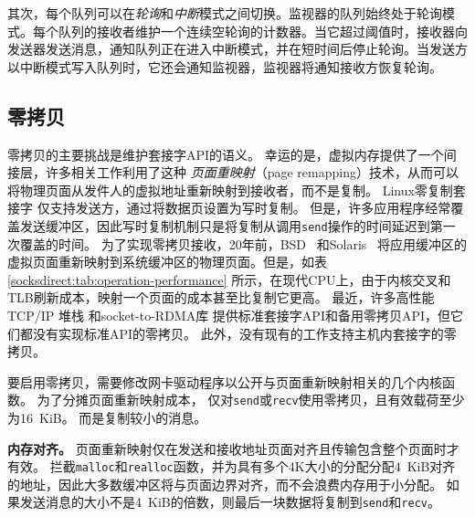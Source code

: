 其次，每个队列可以在\textit {轮询}和\textit {中断}模式之间切换。监视器的队列始终处于轮询模式。每个队列的接收者维护一个连续空轮询的计数器。当它超过阈值时，接收器向发送器发送消息，通知队列正在进入中断模式，并在短时间后停止轮询。当发送方以中断模式写入队列时，它还会通知监视器，监视器将通知接收方恢复轮询。




\subsection{零拷贝}
\label{socksdirect:subsec:zerocopy}


零拷贝的主要挑战是维护套接字API的语义。
幸运的是，虚拟内存提供了一个间接层，许多相关工作利用了这种 \emph {页面重映射}（page remapping）技术，从而可以将物理页面从发件人的虚拟地址重新映射到接收者，而不是复制。
Linux零复制套接字 \cite {linux-zero-copy} 仅支持发送方，通过将数据页设置为写时复制。
但是，许多应用程序经常覆盖发送缓冲区，因此写时复制机制只是将复制从调用\texttt {send}操作的时间延迟到第一次覆盖的时间。
为了实现零拷贝接收，20年前，BSD~ \cite {thadani1995efficient}和Solaris~ \cite {chu1996zero}将应用缓冲区的虚拟页面重新映射到系统缓冲区的物理页面。但是，如表 \ref {socksdirect:tab:operation-performance} 所示，在现代CPU上，由于内核交叉和TLB刷新成本，映射一个页面的成本甚至比复制它更高。
最近，许多高性能 TCP/IP 堆栈 \cite {han2012megapipe,yasukata2016stackmap}和socket-to-RDMA库 \cite {rsockets,socketsdirect}提供标准套接字API和备用零拷贝API，但它们都没有实现标准API的零拷贝。
此外，没有现有的工作支持主机内套接字的零拷贝。





要启用零拷贝，需要修改网卡驱动程序以公开与页面重新映射相关的几个内核函数。
为了分摊页面重新映射成本，\libipc{} 仅对\texttt {send}或\texttt {recv}使用零拷贝，且有效载荷至少为16~KiB。
而是复制较小的消息。

\textbf {内存对齐。}
页面重新映射仅在发送和接收地址页面对齐且传输包含整个页面时才有效。
\libipc{} 拦截\texttt {malloc}和\texttt {realloc}函数，并为具有多个4K大小的分配分配4~KiB对齐的地址，因此大多数缓冲区将与页面边界对齐，而不会浪费内存用于小分配。
如果发送消息的大小不是4~KiB的倍数，则最后一块数据将复制到\texttt {send}和\texttt {recv}。

